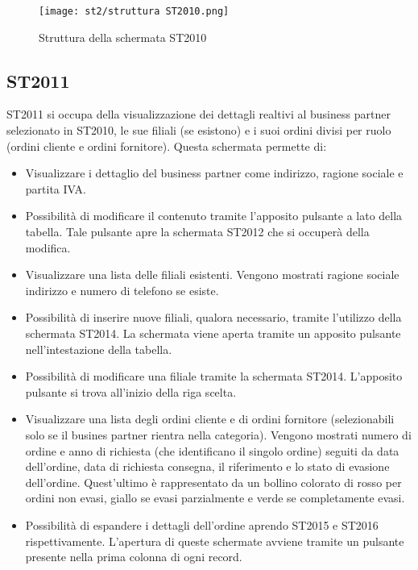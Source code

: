 \documentclass[target=bach,aauheader=,style=]{thud}
\begin{document}
\begin{figure}[H]
    \centering
    \texttt{[image: st2/struttura ST2010.png]}
    \caption{Struttura della schermata ST2010}
\end{figure}



\subsection{ST2011}
ST2011 si occupa della visualizzazione dei dettagli realtivi al business partner selezionato in ST2010, le sue filiali (se esistono) e i suoi ordini divisi per ruolo (ordini cliente e ordini fornitore).
Questa schermata permette di:
\begin{itemize}
    \item Visualizzare i dettaglio del business partner come indirizzo, ragione sociale e partita IVA.
    \item Possibilità di modificare il contenuto tramite l'apposito pulsante a lato della tabella. Tale pulsante apre la schermata ST2012 che si occuperà della modifica.
    \item Visualizzare una lista delle filiali esistenti. Vengono mostrati ragione sociale indirizzo e numero di telefono se esiste.
    \item Possibilità di inserire nuove filiali, qualora necessario, tramite l'utilizzo della schermata ST2014. La schermata viene aperta tramite un apposito pulsante nell'intestazione della tabella.
    \item Possibilità di modificare una filiale tramite la schermata ST2014. L'apposito pulsante si trova all'inizio della riga scelta.
    \item Visualizzare una lista degli ordini cliente e di ordini fornitore (selezionabili solo se il busines partner rientra nella categoria). 
    Vengono mostrati numero di ordine e anno di richiesta (che identificano il singolo ordine) seguiti da data dell'ordine, data di richiesta consegna, il riferimento e lo stato di evasione dell'ordine. 
    Quest'ultimo è rappresentato da un bollino colorato di rosso per ordini non evasi, giallo se evasi parzialmente e verde se completamente evasi.
    \item Possibilità di espandere i dettagli dell'ordine aprendo ST2015 e ST2016 rispettivamente. L'apertura di queste schermate avviene tramite un pulsante presente nella prima colonna di ogni record.
\end{itemize}
\end{document}

